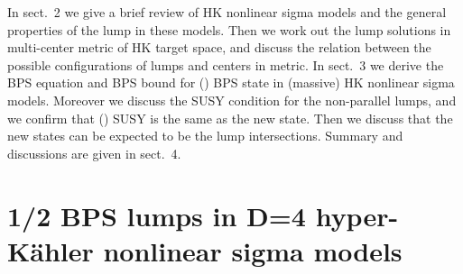\documentclass[a4paper,12pt]{article}
\providecommand{\kahler}{K\"{a}hler }
\begin{document}
In sect.~2 we give a brief review of HK nonlinear sigma models 
and the general properties of the lump in these models. 
Then we work out the lump solutions 
in multi-center metric of HK target space, 
and discuss the relation between the possible configurations of lumps 
and centers in metric.
In sect.~3  we derive the BPS equation and BPS bound for \coordHE{} (\coordHE{}) 
BPS state in \coordHE{} (massive) HK nonlinear sigma models.
Moreover we discuss the SUSY condition for the non-parallel lumps, 
and we confirm that \coordHE{} (\coordHE{}) SUSY is the same as the new state. 
Then we discuss that the new states can be expected to be the lump 
intersections.
Summary and discussions are given in sect.~4.



\vspace{5mm}
\section{1/2 BPS lumps in D=4 hyper-\kahler 
nonlinear sigma models}\label{sc:lump}
\end{document}
